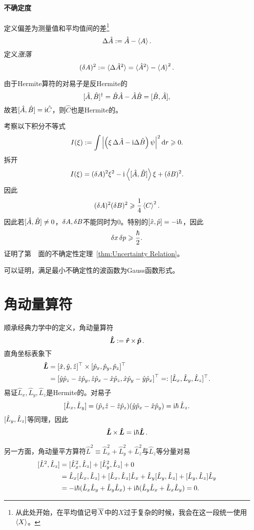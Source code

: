\paragraph{不确定度}定义偏差为测量值和平均值间的差\footnote{从此处开始，在平均值记号$\overline{X}$中的$X$过于复杂的时候，我会在这一段统一使用$\left\langle X\right\rangle$。}
\[
	\Delta\hat A:=\hat A-\left\langle A\right\rangle.
\]
定义\textit{涨落}
\[
	(\mathop{}\!\delta A)^2:=\langle\Delta\hat A^2\rangle=\langle\hat A^2\rangle-\left\langle A\right\rangle^2.
\]

由于Hermite算符的对易子是反Hermite的
\[
	[\hat A,\hat B]^\dagger=\hat B\hat A-\hat A\hat B=[\hat B,\hat A],
\]
故若$[\hat A,\hat B]=\mathrm{i}\hat C$，则$\hat C$也是Hermite的。

考察以下积分不等式
\[
I(\xi):=\int\left\lvert\left(\xi\,\Delta\hat A-\mathrm{i}\Delta\hat B\right)\psi\right\rvert^2\mathop{}\!\mathrm{d} r\geqslant 0.
\]
拆开
\[
I(\xi)=(\mathop{}\!\delta A)^2\xi^2-\mathrm{i}\left\langle [\hat A,\hat B]\right\rangle\xi+(\mathop{}\!\delta B)^2.
\]
因此
\begin{align}
	(\mathop{}\!\delta A)^2(\mathop{}\!\delta B)^2\geqslant\frac14\left\langle C\right\rangle^2.
\end{align}
因此若$[\hat A,\hat B]\neq 0$，$\mathop{}\!\delta A,\mathop{}\!\delta B$不能同时为0。特别的$[\hat x,\hat p]=-\mathrm{i}\hbar$，因此
\begin{align}
	\mathop{}\!\delta x\mathop{}\!\delta p\geqslant\frac{\hbar}2.\label{Proof of UR}
\end{align}
证明了第~\pageref{thm:Uncertainty Relation}~面的不确定性定理~\ref{thm:Uncertainty Relation}。

可以证明，满足最小不确定性的波函数为Gauss函数形式。
\section{角动量算符}
顺承经典力学中的定义，角动量算符
\[
	\bm{\hat L}\!\mathop{}:=\bm{\hat r}\!\mathop{}\times\,\bm{\hat p}\!\mathop{}.
\]
直角坐标表象下
\begin{align*}
	\qo L & =[\hat x,\hat y,\hat z]\tp\times[\hat p_x,\hat p_y,\hat p_z]\tp                             \\
	      & =\fkh{\hat y\hat p_z-\hat z\hat p_y,\hat z\hat p_x-\hat x\hat p_z,\hat x\hat p_y-\hat y\hat p_x}\tp %
	=:[\hat L_x,\hat L_y,\hat L_z]\tp.
\end{align*}
易证$\hat L_x,\hat L_y,\hat L_z$是Hermite的。对易子
\[
	[\hat L_x,\hat L_y]=(\hat p_z\hat z-\hat z\hat p_z)(\hat y\hat p_x-\hat x\hat p_y)=\mathrm{i}\hbar\,\hat L_z.
\]
$[\hat L_y,\hat L_z]$等同理，因此
\begin{align}
	\bm{\hat L}\!\mathop{}\times\,\bm{\hat L}\!\mathop{}=\mathrm{i}\hbar\bm{\hat L}\!\mathop{}.
\end{align}

另一方面，角动量平方算符$\hat L^2\equiv\hat L_x^2+\hat L_y^2+\hat L_z^2$与$\hat L_z$等分量对易
\begin{align}\notag
	[\hat L^2,\hat L_z]&=[\hat L^2_x,\hat L_z]+[\hat L^2_y,\hat L_z]+0\\\notag
	&=\hat L_x[\hat L_x,\hat L_z]+[\hat L_x,\hat L_z]\hat L_x+\hat L_y[\hat L_y,\hat L_z]+[\hat L_y,\hat L_z]\hat L_y\\
	&=-\mathrm{i}\hbar(\hat L_x\hat L_y+\hat L_y\hat L_x)+\mathrm{i}\hbar(\hat L_y\hat L_x+\hat L_x\hat L_y)=0.
\end{align}

